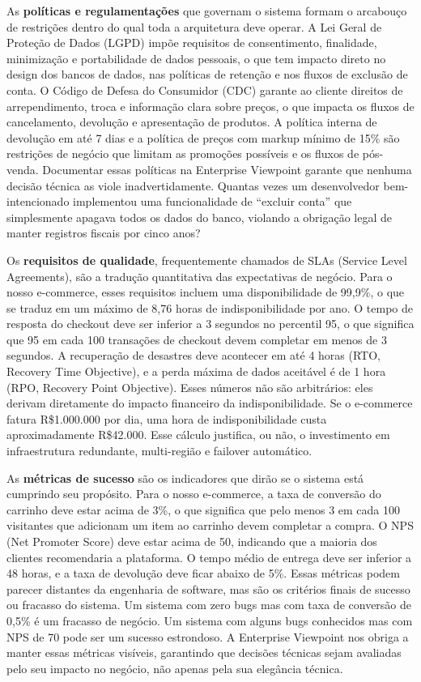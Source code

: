 As \textbf{políticas e regulamentações} que governam o sistema formam o arcabouço
de restrições dentro do qual toda a arquitetura deve operar. A Lei Geral de
Proteção de Dados (LGPD) impõe requisitos de consentimento, finalidade,
minimização e portabilidade de dados pessoais, o que tem impacto direto no
design dos bancos de dados, nas políticas de retenção e nos fluxos de exclusão
de conta. O Código de Defesa do Consumidor (CDC) garante ao cliente direitos de
arrependimento, troca e informação clara sobre preços, o que impacta os fluxos
de cancelamento, devolução e apresentação de produtos. A política interna de
devolução em até 7 dias e a política de preços com markup mínimo de 15\% são
restrições de negócio que limitam as promoções possíveis e os fluxos de
pós-venda. Documentar essas políticas na Enterprise Viewpoint garante que nenhuma
decisão técnica as viole inadvertidamente. Quantas vezes um desenvolvedor bem-
intencionado implementou uma funcionalidade de ``excluir conta'' que simplesmente
apagava todos os dados do banco, violando a obrigação legal de manter registros
fiscais por cinco anos?

Os \textbf{requisitos de qualidade}, frequentemente chamados de SLAs (Service
Level Agreements), são a tradução quantitativa das expectativas de negócio. Para
o nosso e-commerce, esses requisitos incluem uma disponibilidade de 99,9\%, o que
se traduz em um máximo de 8,76 horas de indisponibilidade por ano. O tempo de
resposta do checkout deve ser inferior a 3 segundos no percentil 95, o que
significa que 95 em cada 100 transações de checkout devem completar em menos de 3
segundos. A recuperação de desastres deve acontecer em até 4 horas (RTO, Recovery
Time Objective), e a perda máxima de dados aceitável é de 1 hora (RPO, Recovery
Point Objective). Esses números não são arbitrários: eles derivam diretamente do
impacto financeiro da indisponibilidade. Se o e-commerce fatura R\$1.000.000 por
dia, uma hora de indisponibilidade custa aproximadamente R\$42.000. Esse cálculo
justifica, ou não, o investimento em infraestrutura redundante, multi-região
e failover automático.

As \textbf{métricas de sucesso} são os indicadores que dirão se o sistema está
cumprindo seu propósito. Para o nosso e-commerce, a taxa de conversão do carrinho
deve estar acima de 3\%, o que significa que pelo menos 3 em cada 100 visitantes que
adicionam um item ao carrinho devem completar a compra. O NPS (Net Promoter Score)
deve estar acima de 50, indicando que a maioria dos clientes recomendaria a
plataforma. O tempo médio de entrega deve ser inferior a 48 horas, e a taxa de
devolução deve ficar abaixo de 5\%. Essas métricas podem parecer distantes da
engenharia de software, mas são os critérios finais de sucesso
ou fracasso do sistema. Um sistema com zero bugs mas com taxa de conversão de 0,5\%
é um fracasso de negócio. Um sistema com alguns bugs conhecidos mas com NPS de 70
pode ser um sucesso estrondoso. A Enterprise Viewpoint nos obriga a manter essas
métricas visíveis, garantindo que decisões técnicas sejam avaliadas pelo seu impacto
no negócio, não apenas pela sua elegância técnica.

